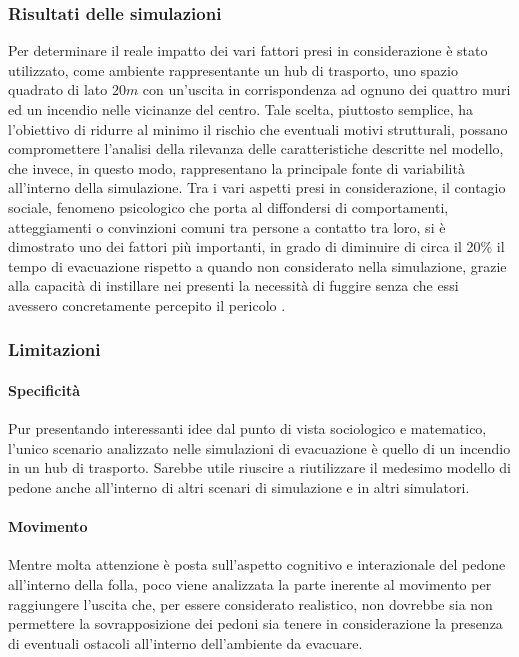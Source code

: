 \subsubsection{Risultati delle simulazioni}
Per determinare il reale impatto dei vari fattori presi in considerazione è stato utilizzato, come ambiente rappresentante un hub di trasporto, uno spazio quadrato di lato $20m$ con un'uscita in corrispondenza ad ognuno dei quattro muri ed un incendio nelle vicinanze del centro. Tale scelta, piuttosto semplice, ha l'obiettivo di ridurre al minimo il rischio che eventuali motivi strutturali, possano compromettere l'analisi della rilevanza delle caratteristiche descritte nel modello, che invece, in questo modo, rappresentano la principale fonte di variabilità all'interno della simulazione. \newline
Tra i vari aspetti presi in considerazione, il contagio sociale, fenomeno psicologico che porta al diffondersi di comportamenti, atteggiamenti o convinzioni comuni tra persone a contatto tra loro, si è dimostrato uno dei fattori più importanti, in grado di diminuire di circa il 20\% il tempo di evacuazione rispetto a quando non considerato nella simulazione, grazie alla capacità di instillare nei presenti la necessità di fuggire senza che essi avessero concretamente percepito il pericolo \cite{vanderWal2017Simulations}.

\subsubsection{Limitazioni}

\paragraph{Specificità} 
Pur presentando interessanti idee dal punto di vista sociologico e matematico, l'unico scenario analizzato nelle simulazioni di evacuazione è quello di un incendio in un hub di trasporto. Sarebbe utile riuscire a riutilizzare il medesimo modello di pedone anche all'interno di altri scenari di simulazione e in altri simulatori.

\paragraph{Movimento}
Mentre molta attenzione è posta sull'aspetto cognitivo e interazionale del pedone all'interno della folla, poco viene analizzata la parte inerente al movimento per raggiungere l'uscita che, per essere considerato realistico, non dovrebbe sia non permettere la sovrapposizione dei pedoni sia tenere in considerazione la presenza di eventuali ostacoli all'interno dell'ambiente da evacuare.

